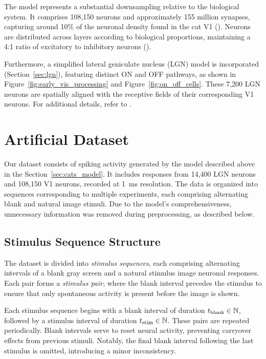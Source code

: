 The model represents a substantial downsampling relative to the biological system. It comprises 108,150 neurons and approximately 155 million synapses, capturing around 10\% of the neuronal density found in the cat V1 (\citet{beaulie1989number}). Neurons are distributed across layers according to biological proportions, maintaining a 4:1 ratio of excitatory to inhibitory neurons (\citet{bealuliee1992quantitative, markram_interneurons_2004}).

Furthermore, a simplified lateral geniculate nucleus (LGN) model is incorporated (Section~\ref{sec:lgn}), featuring distinct ON and OFF pathways, as shown in Figure~\ref{fig:early_vis_processing} and Figure~\ref{fig:on_off_cells}. These 7,200 LGN neurons are spatially aligned with the receptive fields of their corresponding V1 neurons. For additional details, refer to \citet{antolik2024comprehensive}.


\section{Artificial Dataset}
\label{sec:artificial_dataset}
Our dataset consists of spiking activity generated by the model described above in the Section~\ref{sec:cats_model}. It includes responses from 14,400 LGN neurons and 108,150 V1 neurons, recorded at 1~ms resolution. The data is organized into sequences corresponding to multiple experiments, each comprising alternating blank and natural image stimuli. Due to the model's comprehensiveness, unnecessary information was removed during preprocessing, as described below.

\subsection{Stimulus Sequence Structure}
\label{subsec:stimulus_sequence}
The dataset is divided into \emph{stimulus sequences}, each comprising alternating intervals of a blank gray screen and a natural stimulus image neuronal responses. Each pair forms a \emph{stimulus pair}, where the blank interval precedes the stimulus to ensure that only spontaneous activity is present before the image is shown.

Each stimulus sequence begins with a blank interval of duration $t_{\text{blank}}\in \mathbb{N}$, followed by a stimulus interval of duration $t_{\text{stim}} \in \mathbb{N}$. These pairs are repeated periodically. Blank intervals serve to reset neural activity, preventing carryover effects from previous stimuli. Notably, the final blank interval following the last stimulus is omitted, introducing a minor inconsistency.

